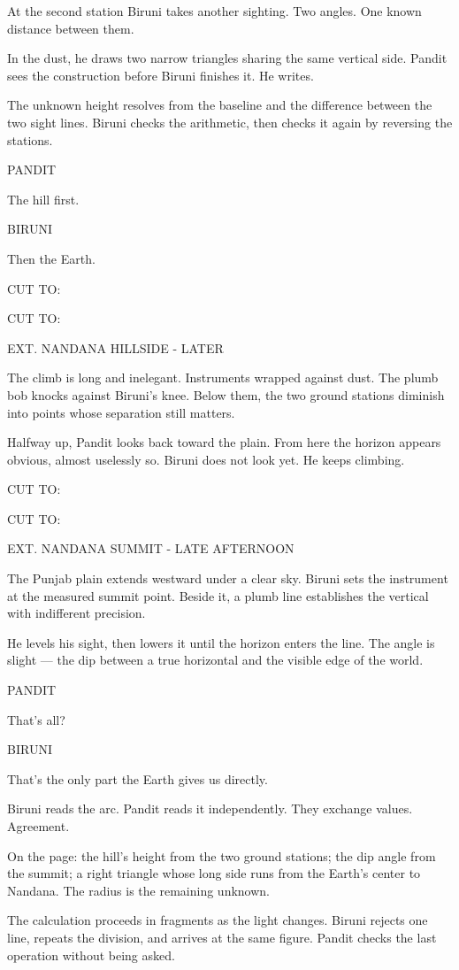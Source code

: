 \documentclass[12pt]{article}
\newcommand{\sceneheading}[1]{%
  \needspace{4\baselineskip}%
  \par\vspace{1\baselineskip}\noindent #1\par\vspace{0.6\baselineskip}%
}
\newcommand{\action}[1]{%
  \par\noindent #1\par\vspace{0.6\baselineskip}%
}
\newcommand{\transition}[1]{%
  \par\vspace{0.3\baselineskip}%
  \ifthenelse{\equal{#1}{FADE IN:}}%
    {\noindent #1\par}%
    {\noindent\hfill #1\par}%
  \vspace{0.6\baselineskip}%
}
\newcommand{\charcue}[1]{%
  \needspace{3\baselineskip}%
  \par\vspace{0.3\baselineskip}\noindent\hspace*{2.2in}#1\par%
}
\newenvironment{dialogue}{%
  \begin{list}{}{%
    \setlength{\leftmargin}{1.1in}%
    \setlength{\rightmargin}{1.6in}%
    \setlength{\listparindent}{0pt}%
    \setlength{\itemindent}{0pt}%
    \setlength{\parsep}{0pt}%
    \setlength{\itemsep}{0pt}%
    \setlength{\topsep}{0pt}%
  }\item[]%
}{%
  \end{list}\vspace{0.4\baselineskip}%
}
\begin{document}
\action{At the second station Biruni takes another sighting. Two angles. One known distance between them.}
\action{In the dust, he draws two narrow triangles sharing the same vertical side. Pandit sees the construction before Biruni finishes it. He writes.}
\action{The unknown height resolves from the baseline and the difference between the two sight lines. Biruni checks the arithmetic, then checks it again by reversing the stations.}
\charcue{PANDIT}
\begin{dialogue}
The hill first.\\
\end{dialogue}
\charcue{BIRUNI}
\begin{dialogue}
Then the Earth.\\
\end{dialogue}
\transition{CUT TO:}
\sceneheading{EXT. NANDANA HILLSIDE - LATER}
\action{The climb is long and inelegant. Instruments wrapped against dust. The plumb bob knocks against Biruni's knee. Below them, the two ground stations diminish into points whose separation still matters.}
\action{Halfway up, Pandit looks back toward the plain. From here the horizon appears obvious, almost uselessly so. Biruni does not look yet. He keeps climbing.}
\transition{CUT TO:}
\sceneheading{EXT. NANDANA SUMMIT - LATE AFTERNOON}
\action{The Punjab plain extends westward under a clear sky. Biruni sets the instrument at the measured summit point. Beside it, a plumb line establishes the vertical with indifferent precision.}
\action{He levels his sight, then lowers it until the horizon enters the line. The angle is slight --- the dip between a true horizontal and the visible edge of the world.}
\charcue{PANDIT}
\begin{dialogue}
That's all?\\
\end{dialogue}
\charcue{BIRUNI}
\begin{dialogue}
That's the only part the Earth gives us directly.\\
\end{dialogue}
\action{Biruni reads the arc. Pandit reads it independently. They exchange values. Agreement.}
\action{On the page: the hill's height from the two ground stations; the dip angle from the summit; a right triangle whose long side runs from the Earth's center to Nandana. The radius is the remaining unknown.}
\action{The calculation proceeds in fragments as the light changes. Biruni rejects one line, repeats the division, and arrives at the same figure. Pandit checks the last operation without being asked.}
\end{document}
